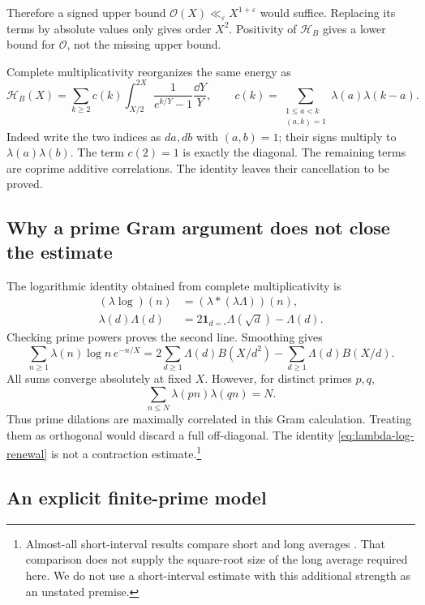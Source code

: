 Therefore a signed upper bound
\(\mathcal O(X)\ll_\varepsilon X^{1+\varepsilon}\)
would suffice. Replacing its terms by absolute values only gives
order \(X^2\). Positivity of \(\mathcal H_B\) gives a lower bound
for \(\mathcal O\), not the missing upper bound.

Complete multiplicativity reorganizes the same energy as
\[
 \mathcal H_B(X)=\sum_{k\ge2}c(k)
       \int_{X/2}^{2X}\frac1{e^{k/Y}-1}\frac{\dd Y}{Y},
 \qquad
 c(k)=\sum_{\substack{1\le a<k\\(a,k)=1}}
             \lambda(a)\lambda(k-a).
\]
Indeed write the two indices as \(da,db\) with \((a,b)=1\);
their signs multiply to \(\lambda(a)\lambda(b)\).
The term \(c(2)=1\) is exactly the diagonal. The remaining terms
are coprime additive correlations. The identity leaves their
cancellation to be proved.



\subsection{Why a prime Gram argument does not close the estimate}

The logarithmic identity obtained from complete multiplicativity is
\begin{align*}
 (\lambda\log)(n)&=(\lambda*(\lambda\Lambda))(n),\\
 \lambda(d)\Lambda(d)
   &=2\mathbf1_{d=\square}\Lambda(\sqrt d)-\Lambda(d).
\end{align*}
Checking prime powers proves the second line. Smoothing gives
\begin{equation}\label{eq:lambda-log-renewal}
 \sum_{n\ge1}\lambda(n)\log n\,e^{-n/X}
 =2\sum_{d\ge1}\Lambda(d)B(X/d^2)
     -\sum_{d\ge1}\Lambda(d)B(X/d).
\end{equation}
All sums converge absolutely at fixed \(X\).
However, for distinct primes \(p,q\),
\[
 \sum_{n\le N}\lambda(pn)\lambda(qn)=N.
\]
Thus prime dilations are maximally correlated in this Gram
calculation. Treating them as orthogonal would discard a full
off-diagonal. The identity \eqref{eq:lambda-log-renewal} is not a
contraction estimate.\footnote{Almost-all short-interval results
compare short and long averages \cite{mr-short}. That comparison
does not supply the square-root size of the long average required
here. We do not use a short-interval estimate with this additional
strength as an unstated premise.}



\subsection{An explicit finite-prime model}

